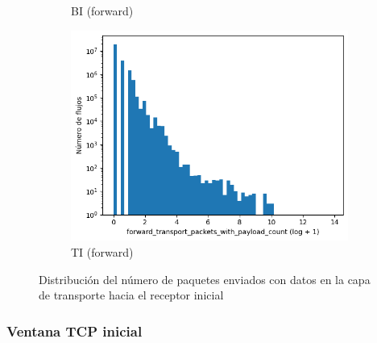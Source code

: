 \begin{figure}[H]
\begin{subfigure}[b]{0.32\textwidth}
        \caption{BI (forward)}
    \end{subfigure}
    \hfill
    \begin{subfigure}[b]{0.32\textwidth}
        \centering
        \includegraphics[width=\linewidth]{media/packet_pincer_toniot/forward_transport_packets_with_payload_count_log_x_log_y.png}
        \caption{TI (forward)}
    \end{subfigure}
       \caption{Distribución del número de paquetes enviados con datos en la capa de transporte hacia el receptor inicial}
       \label{fig:packet_pincer_forward_transport_packets_with_payload_count}
\end{figure}
\subsubsection{Ventana TCP inicial}

